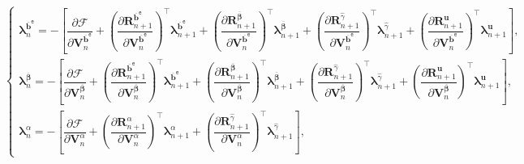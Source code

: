 \documentclass[preprint,11pt]{elsarticle}
\theoremstyle{definition}
\begin{document}
\begin{equation*}
    \left\{ \begin{array}{l}
        \boldsymbol{\lambda}_n^{\overline{\mathbf{b}}^\texttt{e}}
        = - \left[ \dfrac{\partial \mathcal{F}}{\partial \mathbf{V}_n^{\overline{\mathbf{b}}^\texttt{e}}} 
        + \left( \dfrac{\partial \mathbf{R}_{n+1}^{\overline{\mathbf{b}}^\texttt{e}}}{\partial \mathbf{V}_n^{\overline{\mathbf{b}}^\texttt{e}}} \right)^\top \boldsymbol{\lambda}_{n+1}^{\overline{\mathbf{b}}^\texttt{e}}
        + \left( \dfrac{\partial \mathbf{R}_{n+1}^{\overline{\boldsymbol{\beta}}}}{\partial \mathbf{V}_n^{\overline{\mathbf{b}}^\texttt{e}}} \right)^\top \boldsymbol{\lambda}_{n+1}^{\overline{\boldsymbol{\beta}}}
        + \left( \dfrac{\partial \mathbf{R}_{n+1}^{\widehat{\gamma}}}{\partial \mathbf{V}_n^{\overline{\mathbf{b}}^\texttt{e}}} \right)^\top
        \boldsymbol{\lambda}_{n+1}^{\widehat{\gamma}}
        + \left( \dfrac{\partial \mathbf{R}_{n+1}^\mathbf{u}}{\partial \mathbf{V}_n^{\overline{\mathbf{b}}^\texttt{e}}} \right)^\top \boldsymbol{\lambda}_{n+1}^\mathbf{u}
        \right], \\[18pt]

        \boldsymbol{\lambda}_n^{\overline{\boldsymbol{\beta}}}
        = - \left[ \dfrac{\partial \mathcal{F}}{\partial \mathbf{V}_n^{\overline{\boldsymbol{\beta}}}}
        + \left( \dfrac{\partial \mathbf{R}_{n+1}^{\overline{\mathbf{b}}^\texttt{e}}}{\partial \mathbf{V}_n^{\overline{\boldsymbol{\beta}}}} \right)^\top \boldsymbol{\lambda}_{n+1}^{\overline{\mathbf{b}}^\texttt{e}}
        + \left( \dfrac{\partial \mathbf{R}_{n+1}^{\overline{\boldsymbol{\beta}}}}{\partial \mathbf{V}_n^{\overline{\boldsymbol{\beta}}}} \right)^\top \boldsymbol{\lambda}_{n+1}^{\overline{\boldsymbol{\beta}}}
        + \left( \dfrac{\partial \mathbf{R}_{n+1}^{\widehat{\gamma}}}{\partial \mathbf{V}_n^{\overline{\boldsymbol{\beta}}}} \right)^\top \boldsymbol{\lambda}_{n+1}^{\widehat{\gamma}}
        + \left( \dfrac{\partial \mathbf{R}_{n+1}^\mathbf{u}}{\partial \mathbf{V}_n^{\overline{\boldsymbol{\beta}}}} \right)^\top \boldsymbol{\lambda}_{n+1}^\mathbf{u}
        \right], \\[18pt]

        \boldsymbol{\lambda}_n^\alpha = - \left[ \dfrac{\partial \mathcal{F}}{\partial \mathbf{V}_n^\alpha}
        + \left( \dfrac{\partial \mathbf{R}_{n+1}^\alpha}{\partial \mathbf{V}_n^\alpha} \right)^\top \boldsymbol{\lambda}_{n+1}^\alpha
        + \left( \dfrac{\partial \mathbf{R}_{n+1}^{\widehat{\gamma}}}{\partial \mathbf{V}_n^\alpha} \right)^\top \boldsymbol{\lambda}_{n+1}^{\widehat{\gamma}}
        \right],
    \end{array} \right.
\end{equation*}
\end{document}
